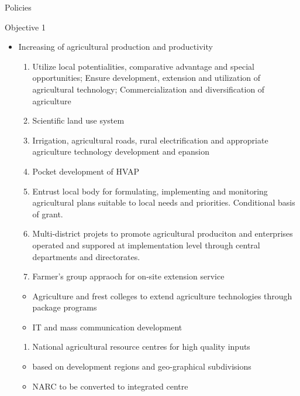 \documentclass[
]{book}
\providecommand{\tightlist}{%
  \setlength{\itemsep}{0pt}\setlength{\parskip}{0pt}}
\begin{document}
Policies

Objective 1

\begin{itemize}
\tightlist
\item
  Increasing of agricultural production and productivity

  \begin{enumerate}
  \def\labelenumi{\arabic{enumi}.}
  \tightlist
  \item
    Utilize local potentialities, comparative advantage and special opportunities; Ensure development, extension and utilization of agricultural technology; Commercialization and diversification of agriculture
  \item
    Scientific land use system
  \item
    Irrigation, agricultural roads, rural electrification and appropriate agriculture technology development and epansion
  \item
    Pocket development of HVAP
  \item
    Entrust local body for formulating, implementing and monitoring agricultural plans suitable to local needs and priorities. Conditional basis of grant.
  \item
    Multi-district projets to promote agricultural produciton and enterprises operated and suppored at implementation level through central departments and directorates.
  \item
    Farmer's group appraoch for on-site extension service
  \end{enumerate}

  \begin{itemize}
  \tightlist
  \item
    Agriculture and frest colleges to extend agriculture technologies through package programs
  \item
    IT and mass communication development
  \end{itemize}

  \begin{enumerate}
  \def\labelenumi{\arabic{enumi}.}
  \setcounter{enumi}{7}
  \tightlist
  \item
    National agricultural resource centres for high quality inputs
  \end{enumerate}

  \begin{itemize}
  \tightlist
  \item
    based on development regions and geo-graphical subdivisions
  \item
    NARC to be converted to integrated centre
  \end{itemize}


\end{itemize}
\end{document}
